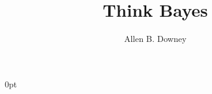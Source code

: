 \documentclass[12pt]{book}
\title{Think Bayes}
\author{Allen B. Downey}
\newif\ifplastex
\begin{document}
\frontmatter

\ifplastex

\else
\fi

\newcommand{\PMF}{\mathrm{PMF}}
\newcommand{\PDF}{\mathrm{PDF}}
\newcommand{\CDF}{\mathrm{CDF}}
\newcommand{\ICDF}{\mathrm{ICDF}}

  {\topsep}%
  {\topsep}%
  {}%
  {0pt}%
  {\bfseries}%
  {}%
  { }%
  {}%

\theoremstyle{exercise}
\newtheorem{exercise}{Exercise}[chapter]


\ifplastex
    \usepackage{localdef}
    \maketitle

\else


\end{document}
